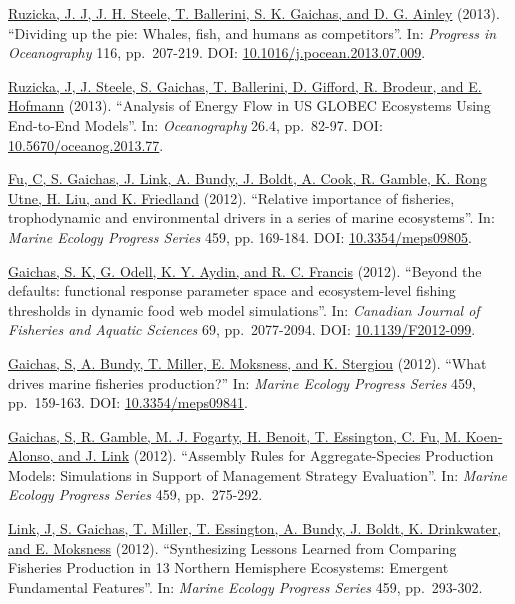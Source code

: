 \documentclass[11pt, a4paper]{awesome-cv}
\begin{document}
\protect\hyperlink{cite-ruzicka_dividing_2013}{Ruzicka, J. J, J. H. Steele, T.
Ballerini, S. K. Gaichas, and D. G.
Ainley} (2013). ``Dividing up the pie:
Whales, fish, and humans as competitors''. In: \emph{Progress in
Oceanography} 116, pp.~207-219. DOI:
\href{https://doi.org/10.1016\%2Fj.pocean.2013.07.009}{10.1016/j.pocean.2013.07.009}.

\protect\hyperlink{cite-ruzicka_analysis_2013}{Ruzicka, J, J. Steele, S.
Gaichas, T. Ballerini, D. Gifford, R. Brodeur, and E.
Hofmann} (2013). ``Analysis of Energy Flow
in US GLOBEC Ecosystems Using End-to-End Models''. In: \emph{Oceanography}
26.4, pp.~82-97. DOI:
\href{https://doi.org/10.5670\%2Foceanog.2013.77}{10.5670/oceanog.2013.77}.

\protect\hyperlink{cite-fu_relative_2012}{Fu, C, S. Gaichas, J. Link, A. Bundy,
J. Boldt, A. Cook, R. Gamble, K. Rong Utne, H. Liu, and K.
Friedland} (2012). ``Relative importance of
fisheries, trophodynamic and environmental drivers in a series of
marine ecosystems''. In: \emph{Marine Ecology Progress Series} 459, pp.
169-184. DOI: \href{https://doi.org/10.3354\%2Fmeps09805}{10.3354/meps09805}.

\protect\hyperlink{cite-gaichas_beyond_2012}{Gaichas, S. K, G. Odell, K. Y.
Aydin, and R. C. Francis} (2012). ``Beyond
the defaults: functional response parameter space and ecosystem-level
fishing thresholds in dynamic food web model simulations''. In:
\emph{Canadian Journal of Fisheries and Aquatic Sciences} 69, pp.~2077-2094.
DOI: \href{https://doi.org/10.1139\%2FF2012-099}{10.1139/F2012-099}.

\protect\hyperlink{cite-gaichas_what_2012}{Gaichas, S, A. Bundy, T. Miller, E.
Moksness, and K. Stergiou} (2012). ``What
drives marine fisheries production?'' In: \emph{Marine Ecology Progress
Series} 459, pp.~159-163. DOI:
\href{https://doi.org/10.3354\%2Fmeps09841}{10.3354/meps09841}.

\protect\hyperlink{cite-gaichas_assembly_2012}{Gaichas, S, R. Gamble, M. J.
Fogarty, H. Benoit, T. Essington, C. Fu, M. Koen-Alonso, and J.
Link} (2012). ``Assembly Rules for
Aggregate-Species Production Models: Simulations in Support of
Management Strategy Evaluation''. In: \emph{Marine Ecology Progress Series}
459, pp.~275-292.

\protect\hyperlink{cite-link_synthesizing_2012}{Link, J, S. Gaichas, T. Miller,
T. Essington, A. Bundy, J. Boldt, K. Drinkwater, and E.
Moksness} (2012). ``Synthesizing Lessons
Learned from Comparing Fisheries Production in 13 Northern Hemisphere
Ecosystems: Emergent Fundamental Features''. In: \emph{Marine Ecology
Progress Series} 459, pp.~293-302.
\end{document}
